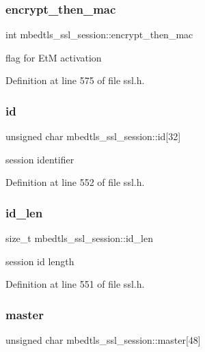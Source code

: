 \subsubsection{\texorpdfstring{encrypt\+\_\+then\+\_\+mac}{encrypt\_then\_mac}}
{\footnotesize\ttfamily int mbedtls\+\_\+ssl\+\_\+session\+::encrypt\+\_\+then\+\_\+mac}

flag for EtM activation 

Definition at line 575 of file ssl.\+h.

\mbox{\label{structmbedtls__ssl__session_abd00d63c5fe4ae5dd87cbba60155fbc4}} 
\subsubsection{\texorpdfstring{id}{id}}
{\footnotesize\ttfamily unsigned char mbedtls\+\_\+ssl\+\_\+session\+::id\mbox{[}32\mbox{]}}

session identifier 

Definition at line 552 of file ssl.\+h.

\mbox{\label{structmbedtls__ssl__session_ad1bc5443b7ac77eadd1df71a69f18ba6}} 
\subsubsection{\texorpdfstring{id\+\_\+len}{id\_len}}
{\footnotesize\ttfamily size\+\_\+t mbedtls\+\_\+ssl\+\_\+session\+::id\+\_\+len}

session id length 

Definition at line 551 of file ssl.\+h.

\mbox{\label{structmbedtls__ssl__session_ae8adb932e053a2179530a8aff8750624}} 
\subsubsection{\texorpdfstring{master}{master}}
{\footnotesize\ttfamily unsigned char mbedtls\+\_\+ssl\+\_\+session\+::master\mbox{[}48\mbox{]}}

